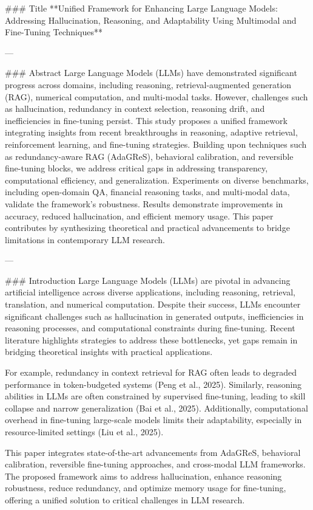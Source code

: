 ### Title  
**Unified Framework for Enhancing Large Language Models: Addressing Hallucination, Reasoning, and Adaptability Using Multimodal and Fine-Tuning Techniques**

---

### Abstract  
Large Language Models (LLMs) have demonstrated significant progress across domains, including reasoning, retrieval-augmented generation (RAG), numerical computation, and multi-modal tasks. However, challenges such as hallucination, redundancy in context selection, reasoning drift, and inefficiencies in fine-tuning persist. This study proposes a unified framework integrating insights from recent breakthroughs in reasoning, adaptive retrieval, reinforcement learning, and fine-tuning strategies. Building upon techniques such as redundancy-aware RAG (AdaGReS), behavioral calibration, and reversible fine-tuning blocks, we address critical gaps in addressing transparency, computational efficiency, and generalization. Experiments on diverse benchmarks, including open-domain QA, financial reasoning tasks, and multi-modal data, validate the framework's robustness. Results demonstrate improvements in accuracy, reduced hallucination, and efficient memory usage. This paper contributes by synthesizing theoretical and practical advancements to bridge limitations in contemporary LLM research.

---

### Introduction  
Large Language Models (LLMs) are pivotal in advancing artificial intelligence across diverse applications, including reasoning, retrieval, translation, and numerical computation. Despite their success, LLMs encounter significant challenges such as hallucination in generated outputs, inefficiencies in reasoning processes, and computational constraints during fine-tuning. Recent literature highlights strategies to address these bottlenecks, yet gaps remain in bridging theoretical insights with practical applications.

For example, redundancy in context retrieval for RAG often leads to degraded performance in token-budgeted systems (Peng et al., 2025). Similarly, reasoning abilities in LLMs are often constrained by supervised fine-tuning, leading to skill collapse and narrow generalization (Bai et al., 2025). Additionally, computational overhead in fine-tuning large-scale models limits their adaptability, especially in resource-limited settings (Liu et al., 2025).

This paper integrates state-of-the-art advancements from AdaGReS, behavioral calibration, reversible fine-tuning approaches, and cross-modal LLM frameworks. The proposed framework aims to address hallucination, enhance reasoning robustness, reduce redundancy, and optimize memory usage for fine-tuning, offering a unified solution to critical challenges in LLM research.

